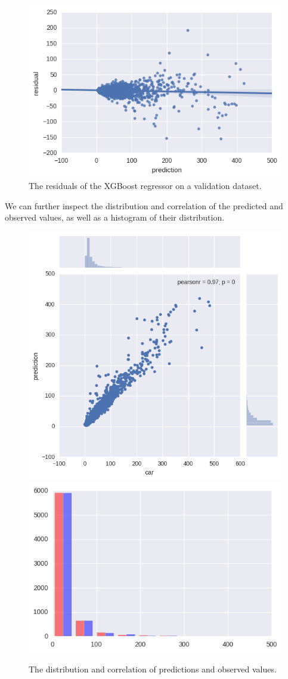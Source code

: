 \documentclass[]{article}
\begin{document}
\begin{figure}

{\centering \includegraphics[width=0.49\linewidth]{../figures/xgb_residuals} 

}

\caption{The residuals of the XGBoost regressor on a validation dataset.}\label{fig:unnamed-chunk-3}
\end{figure}

We can further inspect the distribution and correlation of the predicted
and observed values, as well as a histogram of their distribution.

\begin{figure}

{\centering \includegraphics[width=0.49\linewidth]{../figures/xgb_pred_obs_correlation} \includegraphics[width=0.49\linewidth]{../figures/xgb_hist} 

}

\caption{The distribution and correlation of predictions and observed values.}\label{fig:unnamed-chunk-4}
\end{figure}
\end{document}
